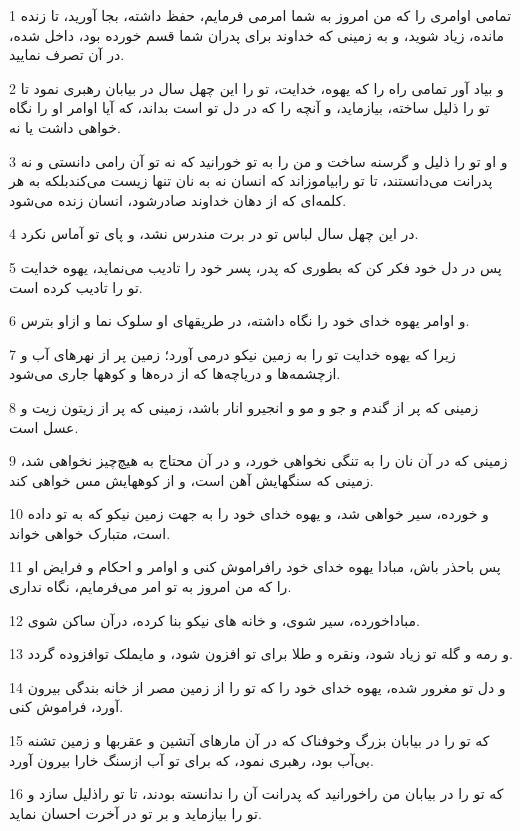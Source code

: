 \par 1 تمامی اوامری را که من امروز به شما امرمی فرمایم، حفظ داشته، بجا آورید، تا زنده مانده، زیاد شوید، و به زمینی که خداوند برای پدران شما قسم خورده بود، داخل شده، در آن تصرف نمایید.
\par 2 و بیاد آور تمامی راه را که یهوه، خدایت، تو را این چهل سال در بیابان رهبری نمود تا تو را ذلیل ساخته، بیازماید، و آنچه را که در دل تو است بداند، که آیا اوامر او را نگاه خواهی داشت یا نه.
\par 3 و او تو را ذلیل و گرسنه ساخت و من را به تو خورانید که نه تو آن رامی دانستی و نه پدرانت می‌دانستند، تا تو رابیاموزاند که انسان نه به نان تنها زیست می‌کندبلکه به هر کلمه‌ای که از دهان خداوند صادرشود، انسان زنده می‌شود.
\par 4 در این چهل سال لباس تو در برت مندرس نشد، و پای تو آماس نکرد.
\par 5 پس در دل خود فکر کن که بطوری که پدر، پسر خود را تادیب می‌نماید، یهوه خدایت تو را تادیب کرده است.
\par 6 و اوامر یهوه خدای خود را نگاه داشته، در طریقهای او سلوک نما و ازاو بترس.
\par 7 زیرا که یهوه خدایت تو را به زمین نیکو درمی آورد؛ زمین پر از نهرهای آب و ازچشمه‌ها و دریاچه‌ها که از دره‌ها و کوهها جاری می‌شود.
\par 8 زمینی که پر از گندم و جو و مو و انجیرو انار باشد، زمینی که پر از زیتون زیت و عسل است.
\par 9 زمینی که در آن نان را به تنگی نخواهی خورد، و در آن محتاج به هیچ‌چیز نخواهی شد، زمینی که سنگهایش آهن است، و از کوههایش مس خواهی کند.
\par 10 و خورده، سیر خواهی شد، و یهوه خدای خود را به جهت زمین نیکو که به تو داده است، متبارک خواهی خواند.
\par 11 پس باحذر باش، مبادا یهوه خدای خود رافراموش کنی و اوامر و احکام و فرایض او را که من امروز به تو امر می‌فرمایم، نگاه نداری.
\par 12 مباداخورده، سیر شوی، و خانه های نیکو بنا کرده، درآن ساکن شوی.
\par 13 و رمه و گله تو زیاد شود، ونقره و طلا برای تو افزون شود، و مایملک توافزوده گردد.
\par 14 و دل تو مغرور شده، یهوه خدای خود را که تو را از زمین مصر از خانه بندگی بیرون آورد، فراموش کنی.
\par 15 که تو را در بیابان بزرگ وخوفناک که در آن مارهای آتشین و عقربها و زمین تشنه بی‌آب بود، رهبری نمود، که برای تو آب ازسنگ خارا بیرون آورد.
\par 16 که تو را در بیابان من راخورانید که پدرانت آن را ندانسته بودند، تا تو راذلیل سازد و تو را بیازماید و بر تو در آخرت احسان نماید.

